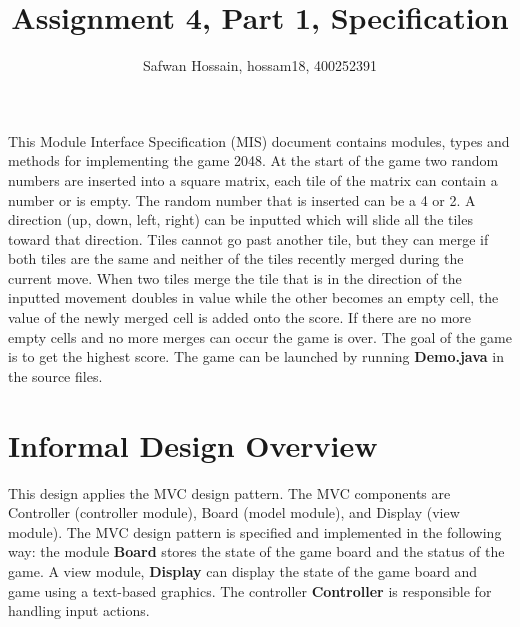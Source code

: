 \documentclass[12pt]{article}
\title{Assignment 4, Part 1, Specification}
\author{Safwan Hossain, hossam18, 400252391}
\newcommand{\authornote}[3]{\textcolor{#1}{[#3 ---#2]}}
\newcommand{\authornote}[3]{}
\newcommand{\wss}[1]{\authornote{blue}{SS}{#1}}
\begin{document}
\maketitle
This Module Interface Specification (MIS) document contains modules, types and
methods for implementing the game 2048. At the start of the game two random numbers are inserted into a square matrix, each tile of the matrix can contain a number or is empty. The random number that is inserted can be a 4 or 2. A direction (up, down, left, right) can be inputted which will slide all the tiles toward that direction. Tiles cannot go past another tile, but they can merge if both tiles are the same and neither of the tiles recently merged during the current move. When two tiles merge the tile that is in the direction of the inputted movement doubles in value while the other becomes an empty cell, the value of the newly merged cell is added onto the score. If there are no more empty cells and no more merges can occur the game is over. The goal of the game is to get the highest score. The game can be launched by running \textbf{Demo.java} in the source files.





% 
% 

\newpage
\section* {Informal Design Overview}
This design applies the MVC design pattern. The MVC components are Controller (controller module), Board (model module), and Display (view module). The MVC design pattern is specified and implemented in the following way: the module \textbf{Board} stores the state of the game board and the status of the game. A view module, \textbf{Display} can display the state of the game board and game using a text-based graphics. The controller \textbf{Controller} is responsible for handling input actions.
\end{document}

